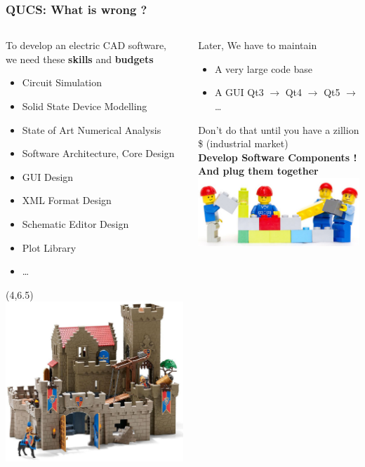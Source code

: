 \begin{frame}
  \frametitle{QUCS: What is wrong ?}
  \begin{columns}
    \begin{column}[t]{.5\textwidth}
      To develop an electric CAD software, \\
      we need these \textbf{skills} and \textbf{budgets}
      {\footnotesize
        \begin{itemize}
        \item Circuit Simulation
        \item Solid State Device Modelling
        \item State of Art Numerical Analysis
        \item Software Architecture, Core Design
        \item GUI Design
        \item XML Format Design
        \item Schematic Editor Design
        \item Plot Library
        \item \ldots
        \end{itemize}%
      }
      \begin{textblock}{6}(4,6.5)
        \includegraphics[width=.4\textwidth]{images/playmobil.jpg}
      \end{textblock}
    \end{column}
    \begin{column}[t]{.5\textwidth}
      Later, We have to \alert{maintain} \\[.5em]
      \begin{itemize}
        \item A very large code base
        \item A GUI Qt3 $\rightarrow$ Qt4 $\rightarrow$ Qt5 $\rightarrow$ \ldots \\[1em]
      \end{itemize}
      \alert{Don't do that} until you have a zillion \$ (industrial market) \\[1em]
      \alert{\textbf{Develop Software Components !}} \\
      \alert{\textbf{And plug them together}} \\
      \includegraphics[width=.5\textwidth]{images/lego2.jpg}
    \end{column}
  \end{columns}
\end{frame}

